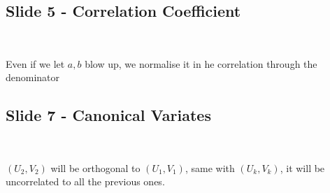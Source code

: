 \subsection{Slide 5 - Correlation Coefficient}\hfill\\\par
\noindent Even if we let $a,b$ blow up, we normalise it in he correlation through the denominator 
\par\bigskip
\subsection{Slide 7 - Canonical Variates}\hfill\\\par
\noindent $(U_2,V_2)$ will be orthogonal to $(U_1,V_1)$, same with $(U_k,V_k)$, it will be uncorrelated to all the previous ones.
\par\bigskip
